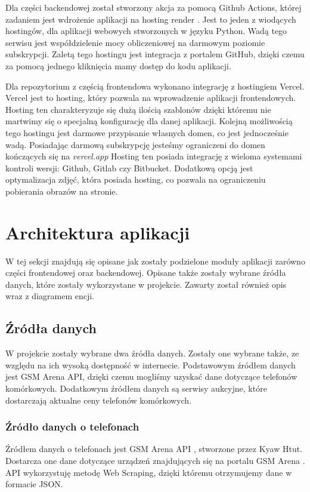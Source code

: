 Dla części backendowej został stworzony akcja za pomocą Github Actions, której zadaniem jest wdrożenie aplikacji na hosting render \cite{render}. Jest to jeden z wiodących hostingów, dla aplikacji webowych stworzonych w języku Python. Wadą tego serwisu jest współdzielenie mocy obliczeniowej na darmowym poziomie subskrypcji. Zaletą tego hostingu jest integracja z portalem GitHub, dzięki czemu za pomocą jednego kliknięcia mamy dostęp do kodu aplikacji.

Dla repozytorium z częścią frontendowa wykonano integrację z hostingiem Vercel. Vercel \cite{vercel} jest to hosting, który pozwala na wprowadzenie aplikacji frontendowych. Hosting ten charakteryzuje się dużą ilością szablonów dzięki któremu nie martwimy się o specjalną konfigurację dla danej aplikacji. Kolejną możliwością tego hostingu jest darmowe przypisanie własnych domen, co jest jednocześnie wadą. Posiadając darmową subskrypcję jesteśmy ograniczeni do domen kończących się na \textit{vercel.app} Hosting ten posiada integrację z wieloma systemami kontroli wersji: Github, Gitlab czy Bitbucket. Dodatkową opcją jest optymalizacja zdjęć, która posiada hosting, co pozwala na ograniczeniu pobierania obrazów na stronie.

\section{Architektura aplikacji}
W tej sekcji znajdują się opisane jak zostały podzielone moduły aplikacji zarówno części frontendowej oraz backendowej. Opisane także zostały wybrane źródła danych, które zostały wykorzystane w projekcie. Zawarty został również opis wraz z diagramem encji.

\subsection{Źródła danych}\label{data_sources}
W projekcie zostały wybrane dwa źródła danych. Zostały one wybrane także, ze względu na ich wysoką dostępność w internecie. Podstawowym źródłem danych jest GSM Arena API, dzięki czemu mogliśmy uzyskać dane dotyczące telefonów komórkowych. Dodatkowym źródłem danych są serwisy aukcyjne, które dostarczają aktualne ceny telefonów komórkowych.

\subsubsection{Źródło danych o telefonach}
Źródłem danych o telefonach jest GSM Arena API \cite{gsm_arena_api}, stworzone przez Kyaw Htut. Dostarcza one dane dotyczące urządzeń znajdujących się na portalu GSM Arena \cite{gsm_arena}. API wykorzystuję metodę Web Scraping, dzięki któremu otrzymujemy dane w formacie JSON.


